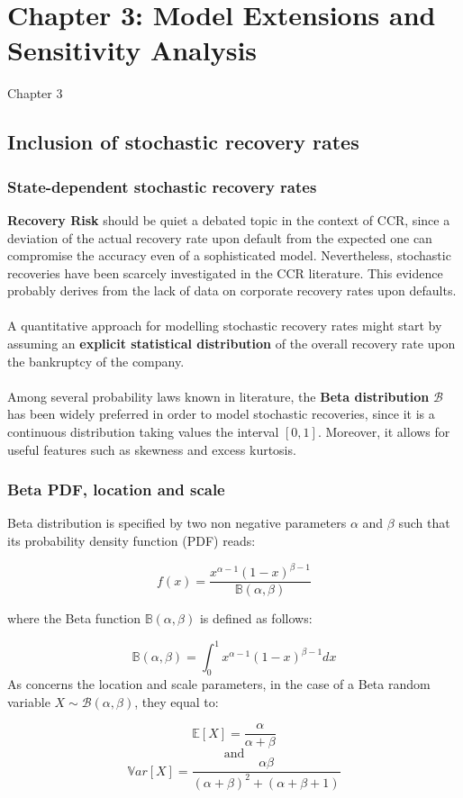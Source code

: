 \documentclass{beamer}
\begin{document}
\section{Chapter 3: Model Extensions and Sensitivity Analysis}
	
\begin{frame}
	\Huge{\centerline{Chapter 3}}
\end{frame}

\subsection{Inclusion of stochastic recovery rates}

\begin{frame}
\frametitle{State-dependent stochastic recovery rates}
	\textbf{Recovery Risk} should be quiet a debated topic in the context of CCR, since a deviation of the actual recovery rate upon default from the expected one can compromise the accuracy even of a sophisticated model. Nevertheless, stochastic recoveries have been scarcely investigated in the CCR literature. This evidence probably derives from the lack of data on corporate recovery rates upon defaults.\\~\\
	A quantitative approach for modelling stochastic recovery rates might start by assuming an \textbf{explicit statistical distribution} of the overall recovery rate upon the bankruptcy of the company.\\~\\
	Among several probability laws known in literature, the \textbf{Beta distribution} $\mathcal{B}$ has been widely preferred in order to model stochastic recoveries, since it is a continuous distribution taking values the interval $[0,1]$. Moreover, it allows for useful features such as skewness and excess kurtosis.
	\end{frame}

\begin{frame}
\frametitle{Beta PDF, location and scale}
	\footnotesize{Beta distribution is specified by two non negative parameters $\alpha$ and $\beta$ such that its probability density function (PDF) reads:
	
	\begin{equation}
	f(x) = \frac{x^{\alpha - 1}(1-x)^{\beta -1}}{\mathbb{B}(\alpha,\beta)}
	\end{equation}
	
	\bigskip
	where the Beta function $\mathbb{B}(\alpha,\beta)$ is defined as follows:
	
	$$\mathbb{B(\alpha,\beta)}=\int_{0}^{1}x^{\alpha - 1}(1-x)^{\beta -1} dx$$
	As concerns the location and scale parameters, in the case of a Beta random variable $X \sim \mathcal{B}(\alpha,\beta)$, they equal to:

	\begin{equation}
		\mathbb{E}[X] = \frac{\alpha}{\alpha + \beta}
	\end{equation}
	$$\text{and}$$
	\begin{equation}
		\mathbb{V}ar[X] = \frac{\alpha \beta}{(\alpha + \beta)^2 + (\alpha + \beta +1)}
	\end{equation}
	}
\end{frame}
\end{document}
